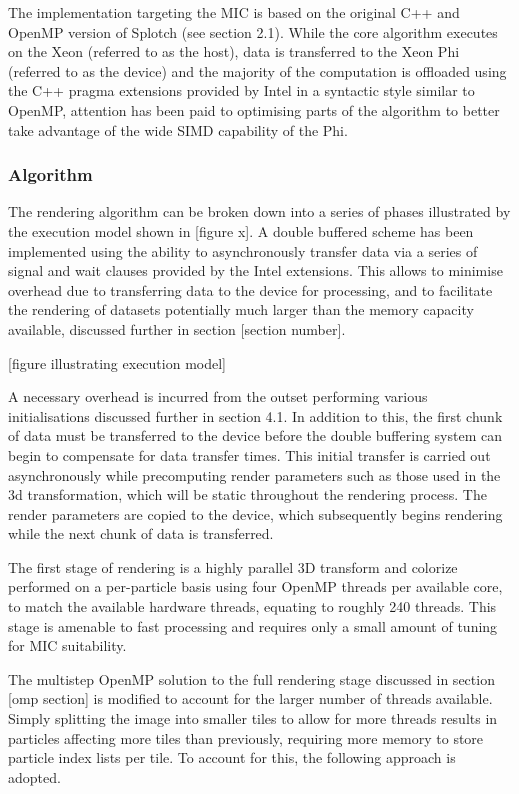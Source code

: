 \documentclass{easychair}
\begin{document}
The implementation targeting the MIC is based on the original C++ and OpenMP version of Splotch (see section 2.1). 
While the core algorithm executes on the Xeon (referred to as the host), data is transferred to the Xeon Phi (referred 
to as the device) and the majority of the computation is offloaded using the C++ pragma extensions provided by Intel 
in a syntactic style similar to OpenMP, attention has been paid to optimising parts of the algorithm to better take 
advantage of the wide SIMD capability of the Phi.


\subsubsection{Algorithm}
\label{sect:micalgorithm}

The rendering algorithm can be broken down into a series of phases illustrated by the execution model shown in [figure x]. 
A double buffered scheme has been implemented using the ability to asynchronously transfer data via a series of signal 
and wait clauses provided by the Intel extensions. This allows to minimise overhead due to transferring data to the device 
for processing, and to facilitate the rendering of datasets potentially much larger than the memory capacity available, 
discussed further in section [section number].

\medskip
\centerline{[figure illustrating execution model]}
\medskip
A necessary overhead is incurred from the outset performing various initialisations discussed further in section 4.1. In 
addition to this, the first chunk of data must be transferred to the device before the double buffering system can begin 
to compensate for data transfer times. This initial transfer is carried out asynchronously while precomputing render 
parameters such as those used in the 3d transformation, which will be static throughout the rendering process. The render 
parameters are copied to the device, which subsequently begins rendering while the next chunk of data is transferred.

The first stage of rendering is a highly parallel 3D transform and colorize performed on a per-particle basis using 
four OpenMP threads per available core, to match the available hardware threads, equating to roughly 240 threads. This 
stage is amenable to fast processing and requires only a small amount of tuning for MIC suitability.

The multistep OpenMP solution to the full rendering stage discussed in section [omp section] is modified to account for 
the larger number of threads available. Simply splitting the image into smaller tiles to allow for more threads results 
in particles affecting more tiles than previously, requiring more memory to store particle index lists per tile. To 
account for this, the following approach is adopted. 
\end{document}
